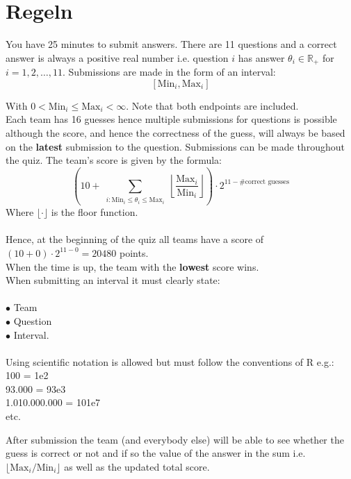 \documentclass[12pt,a4paper]{article}
\begin{document}
 
\section*{Regeln}
You have 25 minutes to submit answers. There are 11 questions and a correct answer is always a positive real number i.e. question $i$ has answer $\theta_i \in \mathbb{R}_+$ for $i = 1,2,\ldots,11$. Submissions are made in the form of an interval:
$$
[\text{Min}_i, \text{Max}_i]
$$

With $0 < \text{Min}_i \leq \text{Max}_i < \infty$.
Note that both endpoints are included. \\
Each team has 16 guesses hence multiple submissions for questions is possible although the score, and hence the correctness of the guess, will always be based on the \textbf{latest} submission to the question.
Submissions can be made throughout the quiz. 
The team's score is given by the formula:
$$
\left( 10 + \sum_{\substack{i : \text{Min}_i \leq \theta_i \leq \text{Max}_i}} \left\lfloor \frac{\text{Max}_i}{\text{Min}_i} \right\rfloor \right) \cdot 2^{11 - \# \text{correct guesses} }
$$
Where $\lfloor \cdot \rfloor$ is the floor function.\\ \\
Hence, at the beginning of the quiz all teams have a score of
$(10 + 0)\cdot 2^{11-0} = 20480$ points. \\
When the time is up, the team with the \textbf{lowest} score wins.\\
When submitting an interval it must clearly state:\\ \\
$\bullet$ Team\\
$\bullet$ Question\\
$\bullet$ Interval. \\ \\
Using scientific notation is allowed but must follow the conventions of R e.g.:\\
100 = 1e2 \\
93.000 = 93e3 \\
1.010.000.000 = 101e7 \\
etc.

After submission the team (and everybody else) will be able to see whether the guess is correct or not and if so the value of the answer in the sum i.e. $\lfloor \text{Max}_i / \text{Min}_i \rfloor$ as well as the updated total score.

\newpage
\end{document}
